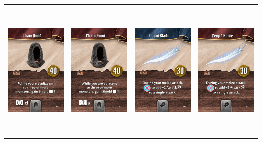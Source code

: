 \documentclass{minimal}
\begin{document}
{\begin{longtable}{llll}
\includegraphics[width=44mm,height=68mm]{./64-151/gh-076b-chain-hood.png} &
\includegraphics[width=44mm,height=68mm]{./64-151/gh-076b-chain-hood.png} &
\includegraphics[width=44mm,height=68mm]{./64-151/gh-077a-frigid-blade.png} &
\includegraphics[width=44mm,height=68mm]{./64-151/gh-077b-frigid-blade.png}\\ 

\end{longtable}}
\end{document}
